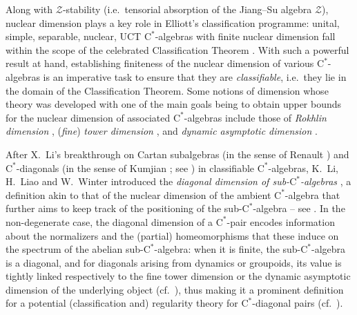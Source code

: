 \documentclass[11pt,a4paper]{amsart}
\theoremstyle{definition}
\numberwithin{equation}{section}
\newcommand{\mc}[1]{\mathcal{#1}}
\begin{document}
Along with $\mathcal{Z}$-stability (i.e.\ tensorial absorption of the Jiang--Su algebra $\mc{Z}$), nuclear dimension plays a key role in Elliott's classification programme: unital, simple, separable, nuclear, UCT $\mathrm{C}^\ast$-algebras with finite nuclear dimension fall within the scope of the celebrated Classification Theorem \cite[Theorem~5.3]{Whi23}. With such a powerful result at hand, establishing finiteness of the nuclear dimension of various $\mathrm{C}^\ast$-algebras is an imperative task to ensure that they are \emph{classifiable}, i.e.\ they lie in the domain of the Classification Theorem. Some notions of dimension whose theory was developed with one of the main goals being to obtain upper bounds for the nuclear dimension of associated $\mathrm{C}^\ast$-algebras include those of \emph{Rokhlin dimension} \cite{HirshbergWinterZacharias15, Sza15, SimSzaWil20}, (\emph{fine}) \emph{tower dimension} \cite{Ker20}, and  \emph{dynamic asymptotic dimension} \cite{GueWilYu17, Bonicke24}.




After X.\ Li's breakthrough \cite{Li20} on Cartan subalgebras (in the sense of Renault \cite{Ren08}) and $\mathrm{C}^\ast$-diagonals (in the sense of Kumjian \cite{Kum86}; see ) in classifiable $\mathrm{C}^\ast$-algebras, K.\ Li, H.\ Liao and W.\ Winter introduced the \emph{diagonal dimension of sub-$\mathrm{C}^\ast$-algebras} \cite{LiLiaWin23}, a definition akin to that of the nuclear dimension of the ambient $\mathrm{C}^\ast$-algebra that further aims to keep track of the positioning of the sub-$\mathrm{C}^\ast$-algebra -- see .  In the non-degenerate case, the diagonal dimension of a $\mathrm{C}^\ast$-pair encodes information about the normalizers and the (partial) homeomorphisms that these induce on the spectrum of the abelian sub-$\mathrm{C}^\ast$-algebra: when it is finite, the sub-$\mathrm{C}^\ast$-algebra is a diagonal, and for  diagonals arising from dynamics or groupoids, its value is tightly linked respectively to the fine tower dimension or the dynamic asymptotic dimension of the underlying object (cf.\ \cite[Theorems~B, E]{LiLiaWin23}), thus making it a prominent definition for a potential (classification and) regularity theory for $\mathrm{C}^\ast$-diagonal pairs (cf.\ \cite[Problem~XLVIII]{SchTikWhi25}).
\end{document}
